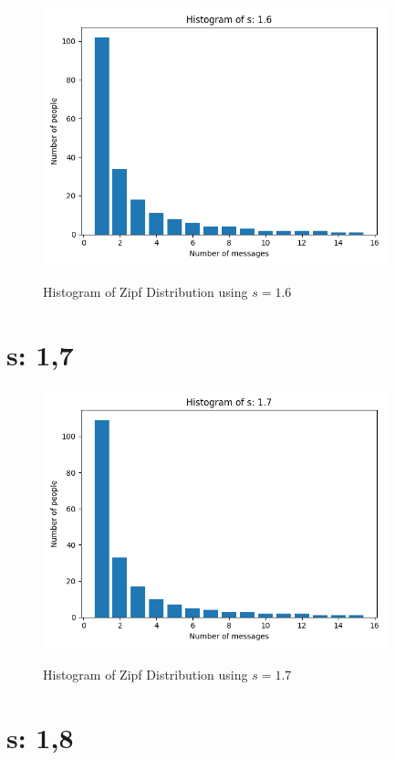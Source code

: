 \documentclass{article}
\begin{document}
\begin{figure}[H] \centering
 \includegraphics[width=10cm]{imgs/histogram-16.png}
 \label{fig:hist-16}
 \caption{Histogram of Zipf Distribution using $s=1.6$} \end{figure}




\section{s: 1,7}

\begin{figure}[H] \centering
 \includegraphics[width=10cm]{imgs/histogram-17.png}
 \label{fig:hist-17}
 \caption{Histogram of Zipf Distribution using $s=1.7$} \end{figure}




\section{s: 1,8}
\end{document}
